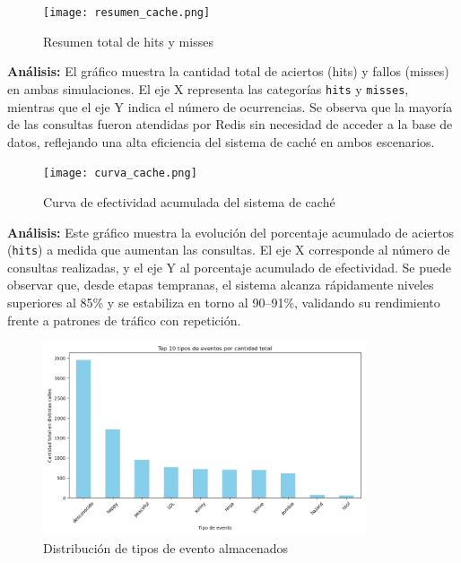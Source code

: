 \documentclass[12pt]{article}
\begin{document}
\begin{figure}[H]
    \centering
    \texttt{[image: resumen\_cache.png]}
    \caption{Resumen total de hits y misses}
\end{figure}

\textbf{Análisis:} El gráfico muestra la cantidad total de aciertos (hits) y fallos (misses) en ambas simulaciones. El eje X representa las categorías \texttt{hits} y \texttt{misses}, mientras que el eje Y indica el número de ocurrencias. Se observa que la mayoría de las consultas fueron atendidas por Redis sin necesidad de acceder a la base de datos, reflejando una alta eficiencia del sistema de caché en ambos escenarios.

\vspace{0.5cm}

\begin{figure}[H]
    \centering
    \texttt{[image: curva\_cache.png]}
    \caption{Curva de efectividad acumulada del sistema de caché}
\end{figure}

\textbf{Análisis:} Este gráfico muestra la evolución del porcentaje acumulado de aciertos (\texttt{hits}) a medida que aumentan las consultas. El eje X corresponde al número de consultas realizadas, y el eje Y al porcentaje acumulado de efectividad. Se puede observar que, desde etapas tempranas, el sistema alcanza rápidamente niveles superiores al 85\% y se estabiliza en torno al 90–91\%, validando su rendimiento frente a patrones de tráfico con repetición.

\vspace{0.5cm}

\begin{figure}[H]
    \centering
    \includegraphics[width=0.85\textwidth]{distribucion_tipos_evento.png}
    \caption{Distribución de tipos de evento almacenados}
\end{figure}
\end{document}

